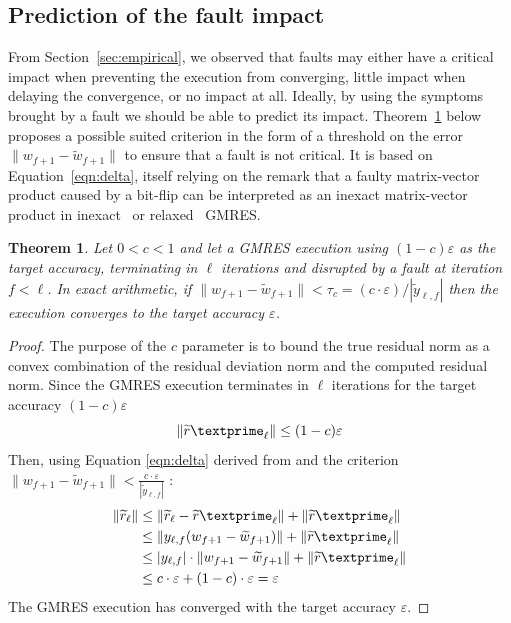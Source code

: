 \documentclass[twoside]{article}
\newtheorem{theorem}{Theorem}
\begin{document}
  \subsection{Prediction of the fault impact}\label{sec:prediction}
  From Section~\ref{sec:empirical}, we observed that faults may either have a critical impact when preventing the execution from converging, little impact when delaying the convergence, or no impact at all. Ideally, by using the symptoms brought by a fault we should be able to predict its impact.
  Theorem~\ref{theorem} below proposes a possible suited criterion in the form of a threshold on the error $\|{w}_{f+1} - \widetilde{w}_{f+1}\|$ to ensure that a fault is not critical.
  It is based on Equation~\eqref{eqn:delta}, itself relying on the remark that a faulty matrix-vector product caused by a bit-flip can be interpreted as an inexact matrix-vector product in inexact~\cite{sisz:03} or
  relaxed~\cite{DBLP:journals/siamsc/GiraudGL07} GMRES.
  \begin{theorem}\label{theorem}
    Let $0 < c < 1$ and let a GMRES execution using $(1-c) \varepsilon$ as the target accuracy, terminating in $\ell$ iterations and disrupted by a fault at iteration $f < \ell$. In exact arithmetic, if $\|{w}_{f+1} - \widetilde{w}_{f+1}\| < \tau_c = (c \cdot \varepsilon) / |\widetilde{y}_{\ell, f}|$ then the execution converges to the target accuracy $\varepsilon$.
  \end{theorem}
  \begin{proof}
    The purpose of the $c$ parameter is to bound the true residual norm as a convex combination of the residual deviation norm and the computed residual norm.
    Since the GMRES execution terminates in $\ell$ iterations for the target accuracy $(1 - c) \varepsilon$ $$\|\widetilde{r}\textprime_{\ell}\| \leq (1 - c) \varepsilon$$
    Then, using Equation \eqref{eqn:delta} derived from \cite{DBLP:journals/siamsc/GiraudGL07} and the criterion $\|{w}_{f+1} - \widetilde{w}_{f+1}\| < \frac{c \cdot \varepsilon}{|\widetilde{y}_{\ell, f}|}$ :
    \begin{equation}
      \begin{split}
        \|\widetilde{r}_\ell\| & \leq \|\widetilde{r}_\ell - \widetilde{r}\textprime_\ell \| + \|\widetilde{r}\textprime_\ell\| \\
        &\leq \|y_{\ell, f} (w_{f+1} - \widetilde{w}_{f+1}) \| + \|\widetilde{r}\textprime_\ell\| \\
        &\leq |y_{\ell, f}| \cdot \|{w}_{f+1} - \widetilde{w}_{f+1}\| + \|\widetilde{r}\textprime_\ell\| \\
        &\leq c \cdot \varepsilon + (1 - c) \cdot \varepsilon = \varepsilon\\
      \end{split}
    \end{equation}
    The GMRES execution has converged with the target accuracy $\varepsilon$.
  \end{proof}
\end{document}
